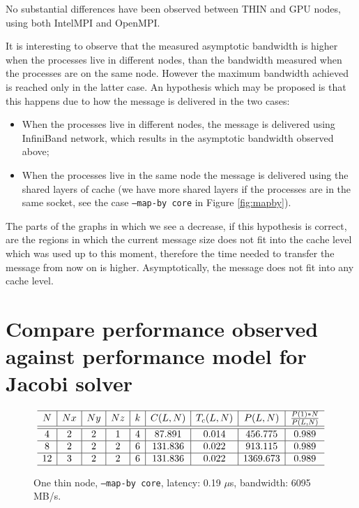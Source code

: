 \documentclass{article}
\begin{document}
No substantial differences have been observed between THIN and GPU nodes, using both IntelMPI and OpenMPI.

It is interesting to observe that the measured asymptotic bandwidth is higher when the processes live in different nodes, than the bandwidth measured when the processes are on the same node. However the maximum bandwidth achieved is reached only in the latter case. An hypothesis which may be proposed is that this happens due to how the message is delivered in the two cases:
\begin{itemize}
    \item When the processes live in different nodes, the message is delivered using InfiniBand network, which results in the asymptotic bandwidth observed above;
    \item When the processes live in the same node the message is delivered using the shared layers of cache (we have more shared layers if the processes are in the same socket, see the case \texttt{--map-by core} in Figure \ref{fig:mapby}).
\end{itemize}
The parts of the graphs in which we see a decrease, if this hypothesis is correct, are the regions in which the current message size does not fit into the cache level which was used up to this moment, therefore the time needed to transfer the message from now on is higher. Asymptotically, the message does not fit into any cache level.

\section{Compare performance observed against performance model for Jacobi solver}

\begin{figure}
    $$
        \begin{array}{c | c | c | c | c | c | c | c | c} \hline
            N  & Nx & Ny & Nz & k & C(L,N)  & T_c(L,N) &     P(L,N)     & \frac{P(1)*N}{P(L,N)} \\ \hline
            \hline
            4  & 2  & 2  & 1  & 4 & 87.891  &  0.014   & 456.775  &         0.989         \\ \hline
            8  & 2  & 2  & 2  & 6 & 131.836 &  0.022   & 913.115  &         0.989         \\ \hline
            12 & 3  & 2  & 2  & 6 & 131.836 &  0.022   & 1369.673 &         0.989         \\ \hline
        \end{array}
    $$
    \caption{One thin node, \texttt{--map-by core}, latency: 0.19 $\mu$s, bandwidth: 6095 MB/s.}
\end{figure}
\end{document}

